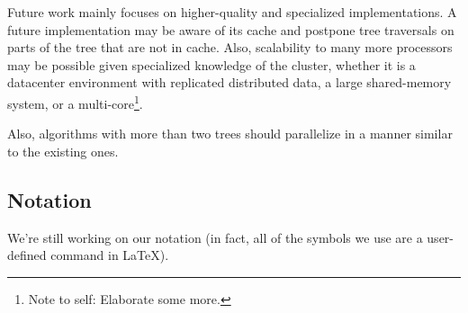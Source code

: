 \documentclass[times, leqno,twocolumn]{article}
\newcommand{\authornote}[1]{\footnote{Note to self: #1}}
\newcommand{\authorsnote}[1]{\authornote{#1}}
\begin{document}
Future work mainly focuses on higher-quality and specialized implementations.
A future implementation may be aware of its cache and postpone tree traversals on parts of the tree that are not in cache.
Also, scalability to many more processors may be possible given specialized knowledge of the cluster, whether it is a datacenter environment with replicated distributed data, a large shared-memory system, or a multi-core\authorsnote{Elaborate some more.}.

Also, algorithms with more than two trees should parallelize in a manner similar to the existing ones.




\begin{appendix}

\section{Notation}

We're still working on our notation (in fact, all of the symbols we use are a user-defined command in LaTeX).


\end{appendix}
\end{document}
